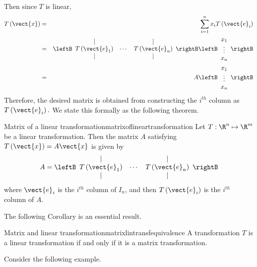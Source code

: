 Then since $T$ is linear,
\begin{eqnarray*}
T\left( \vect{x} \right)&=&\sum_{i=1}^{n}x_{i}T\left( \vect{e}_{i}\right) \\
&=&\leftB
\begin{array}{ccc}
| &  & | \\
T\left( \vect{e}_{1}\right) & \cdots & T\left( \vect{e}_{n}\right) \\
| &  & |
\end{array}
\rightB \leftB
\begin{array}{c}
x_{1} \\
\vdots \\
x_{n}
\end{array}
\rightB \\
&=& A\leftB
\begin{array}{c}
x_{1} \\
\vdots \\
x_{n}
\end{array}
\rightB
\end{eqnarray*}
Therefore,  the desired matrix is obtained from constructing the $i^{th}$
column as $T\left( \vect{e}_{i}\right) .$ We state this formally as the
following theorem.

\begin{theorem}{Matrix of a linear transformation}{matrixoflineartransformation}
Let $T: \R^{n} \mapsto \R^{m}$ be a linear transformation. Then the matrix $A$ satisfying $T\left(\vect{x}\right)=A\vect{x}$ is given by
\begin{equation*}
A=
\leftB
\begin{array}{ccc}
| &  & | \\
T\left( \vect{e}_{1}\right) & \cdots & T\left( \vect{e}_{n}\right) \\
| &  & |
\end{array}
\rightB
\end{equation*}
where $\vect{e}_{i}$ is the $i^{th}$ column of $I_n$, and then $T\left( \vect{e}_{i}
\right)$ is the $i^{th}$ column of $A.$
\end{theorem}

The following Corollary is an essential result.

\begin{corollary}{Matrix and linear transformation}{matrixlintransfequivalence}
A transformation $T$ is a linear transformation if and only if it is a matrix transformation. 
\end{corollary}

Consider the following example.

